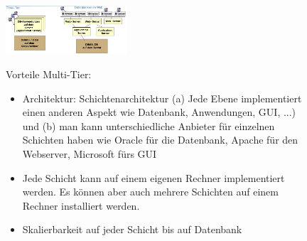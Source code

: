 \documentclass[10pt]{scrartcl}
\begin{document}
\begin{figure}
  \begin{center}
    \includegraphics[width=0.4\textwidth]{img/sysarc-2.jpg}
  \end{center}
Vorteile Multi-Tier:
\begin{itemize}
\item Architektur: Schichtenarchitektur (a) Jede Ebene implementiert einen anderen Aspekt wie Datenbank, Anwendungen, GUI, ...) und (b) man kann unterschiedliche Anbieter für einzelnen Schichten haben wie Oracle für die Datenbank, Apache für den Webserver, Microsoft fürs GUI
\item Jede Schicht kann auf einem eigenen Rechner implementiert werden. Es können aber auch mehrere Schichten auf einem Rechner installiert werden.
\item Skalierbarkeit auf jeder Schicht bis auf Datenbank
\end{itemize}
\end{figure}



 
\end{document}
